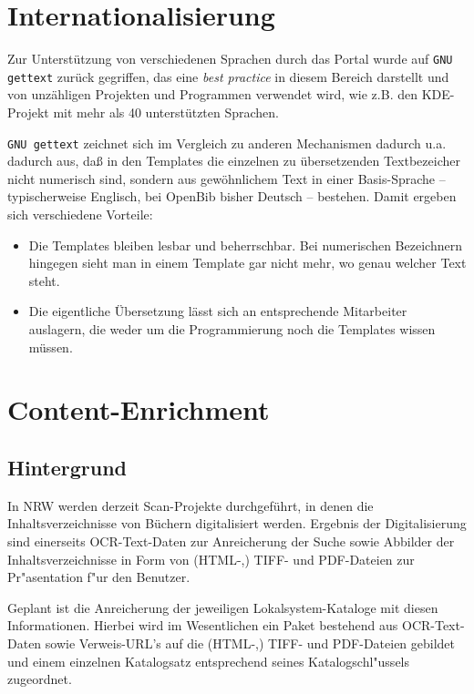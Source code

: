 \documentclass[11pt, twoside, a4paper, BCOR8mm, DIV12, bibtotoc,idxtotoc]{scrbook}
\begin{document}
\section{Internationalisierung}

Zur Unterstützung von verschiedenen Sprachen durch das Portal wurde
auf \texttt{GNU gettext} zurück gegriffen, das eine \emph{best
  practice} in diesem Bereich darstellt und von unzähligen Projekten
und Programmen verwendet wird, wie z.B. den KDE-Projekt mit mehr als
40 unterstützten Sprachen.

\texttt{GNU gettext} zeichnet sich im Vergleich zu anderen Mechanismen
dadurch u.a. dadurch aus, daß in den Templates die einzelnen zu
übersetzenden Textbezeicher nicht numerisch sind, sondern aus
gewöhnlichem Text in einer Basis-Sprache -- typischerweise Englisch,
bei OpenBib bisher Deutsch -- bestehen. Damit ergeben sich
verschiedene Vorteile:

\begin{itemize}
\item Die Templates bleiben lesbar und beherrschbar. Bei numerischen
  Bezeichnern hingegen sieht man in einem Template gar nicht mehr, wo
  genau welcher Text steht.
\item Die eigentliche Übersetzung lässt sich an entsprechende
  Mitarbeiter auslagern, die weder um die Programmierung noch die
  Templates wissen müssen.
\end{itemize}


\section{Content-Enrichment}

\subsection{Hintergrund}

In NRW werden derzeit Scan-Projekte durchgeführt, in denen die
Inhaltsverzeichnisse von Büchern digitalisiert werden. Ergebnis der
Digitalisierung sind einerseits OCR-Text-Daten zur Anreicherung der
Suche sowie Abbilder der Inhaltsverzeichnisse in Form von (HTML-,)
TIFF- und PDF-Dateien zur Pr"asentation f"ur den Benutzer.

Geplant ist die Anreicherung der jeweiligen Lokalsystem-Kataloge mit
diesen Informationen. Hierbei wird im Wesentlichen ein Paket bestehend
aus OCR-Text-Daten sowie Verweis-URL's auf die (HTML-,) TIFF- und
PDF-Dateien gebildet und einem einzelnen Katalogsatz entsprechend
seines Katalogschl"ussels zugeordnet.
\end{document}
